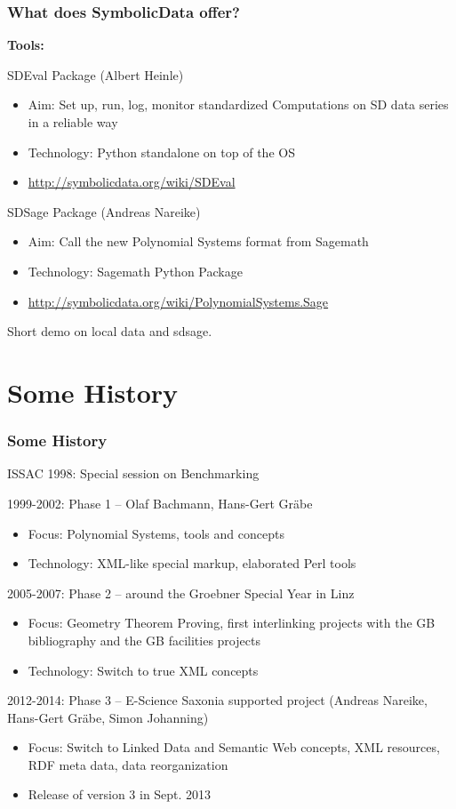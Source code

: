 \documentclass{beamer}
\begin{document}
\begin{frame}\frametitle{What does SymbolicData offer?}
\textbf{Tools:}\bigskip

SDEval Package (Albert Heinle)
\begin{itemize}\small
\item Aim: Set up, run, log, monitor standardized Computations on SD data
  series in a reliable way 
\item Technology: Python standalone on top of the OS
\item \url{http://symbolicdata.org/wiki/SDEval}
\end{itemize}
SDSage Package (Andreas Nareike)
\begin{itemize}\small
\item Aim: Call the new Polynomial Systems format from Sagemath 
\item Technology: Sagemath Python Package
\item \url{http://symbolicdata.org/wiki/PolynomialSystems.Sage}
\end{itemize}
Short demo on local data and sdsage.
\end{frame}

\section{Some History}
\begin{frame}\frametitle{Some History}\small
ISSAC 1998: Special session on Benchmarking\medskip

1999-2002: Phase 1 -- Olaf Bachmann, Hans-Gert Gr\"abe
\begin{itemize}
\item Focus: Polynomial Systems, tools and concepts
\item Technology: XML-like special markup, elaborated Perl tools
\end{itemize}
2005-2007: Phase 2 -- around the Groebner Special Year in Linz
\begin{itemize}
\item Focus: Geometry Theorem Proving, first interlinking projects with the GB
  bibliography and the GB facilities projects
\item Technology: Switch to true XML concepts
\end{itemize}
2012-2014: Phase 3 -- E-Science Saxonia supported project (Andreas Nareike,
Hans-Gert Gr\"abe, Simon Johanning)
\begin{itemize}
\item Focus: Switch to Linked Data and Semantic Web concepts, XML resources,
  RDF meta data, data reorganization
\item Release of version 3 in Sept. 2013
\end{itemize}
\end{frame}
\end{document}
